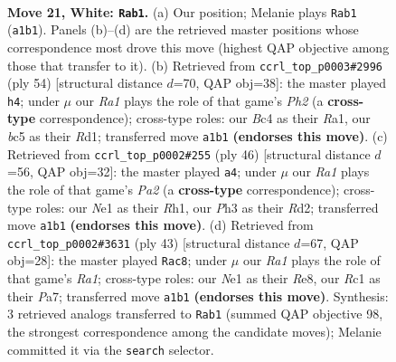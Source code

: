 \documentclass[11pt]{article}
\begin{document}
\clearpage

\begin{figure}[p]\centering
\begin{subfigure}{0.46\textwidth}\centering
\resizebox{\linewidth}{!}{%
\newchessgame
\chessboard[
  setfen={rnbr2k1/5p2/1p2pn2/2b4p/2B1P3/p1N3BP/PP3PK1/R1R1N3 w - - 0 21},
  showmover=false,
  pgfstyle=straightmove, color=movearrow, markmove={a1-b1}
]}
\caption{}
\end{subfigure}\hfill
\begin{subfigure}{0.46\textwidth}\centering
\resizebox{\linewidth}{!}{%
\newchessgame
\chessboard[
  setfen={r5k1/1r1n1p2/2bBp2p/p1p3p1/P3Pn2/2N2P2/6PP/R2R1BK1 w - - 4 28},
  showmover=false,
  pgfstyle=straightmove, color=movearrow, markmove={h2-h4}
]}
\caption{}
\end{subfigure}
\\[4pt]
\begin{subfigure}{0.46\textwidth}\centering
\resizebox{\linewidth}{!}{%
\newchessgame
\chessboard[
  setfen={2b1k2r/4b1p1/pr1pp1Pp/1p2n3/4P2P/2N3B1/PPPRB3/2K4R w k - 1 24},
  showmover=false,
  pgfstyle=straightmove, color=movearrow, markmove={a2-a4}
]}
\caption{}
\end{subfigure}\hfill
\begin{subfigure}{0.46\textwidth}\centering
\resizebox{\linewidth}{!}{%
\newchessgame
\chessboard[
  setfen={r3r1k1/pp3pbp/2ppb3/4n3/NPP2R2/2B3P1/P1R1PPBP/5K2 b - - 2 22},
  showmover=false,
  pgfstyle=straightmove, color=movearrow, markmove={a8-c8}
]}
\caption{}
\end{subfigure}
\caption{\textbf{Move 21, White: \texttt{Rab1}.} (a) Our position; Melanie plays \texttt{Rab1} (\texttt{a1b1}). Panels (b)--(d) are the retrieved master positions whose correspondence most drove this move (highest QAP objective among those that transfer to it). (b) Retrieved from \texttt{ccrl\_top\_p0003\#2996} (ply 54) [structural distance $d$=70, QAP obj=38]: the master played \texttt{h4}; under $\mu$ our \emph{Ra1} plays the role of that game's \emph{Ph2} (a \textbf{cross-type} correspondence); cross-type roles: our \emph{B}c4 as their \emph{R}a1, our \emph{b}c5 as their \emph{R}d1; transferred move \texttt{a1b1} \textbf{(endorses this move)}. (c) Retrieved from \texttt{ccrl\_top\_p0002\#255} (ply 46) [structural distance $d$=56, QAP obj=32]: the master played \texttt{a4}; under $\mu$ our \emph{Ra1} plays the role of that game's \emph{Pa2} (a \textbf{cross-type} correspondence); cross-type roles: our \emph{N}e1 as their \emph{R}h1, our \emph{P}h3 as their \emph{R}d2; transferred move \texttt{a1b1} \textbf{(endorses this move)}. (d) Retrieved from \texttt{ccrl\_top\_p0002\#3631} (ply 43) [structural distance $d$=67, QAP obj=28]: the master played \texttt{Rac8}; under $\mu$ our \emph{Ra1} plays the role of that game's \emph{Ra1}; cross-type roles: our \emph{N}e1 as their \emph{R}e8, our \emph{R}c1 as their \emph{P}a7; transferred move \texttt{a1b1} \textbf{(endorses this move)}. Synthesis: 3 retrieved analogs transferred to \texttt{Rab1} (summed QAP objective 98, the strongest correspondence among the candidate moves); Melanie committed it via the \texttt{search} selector.}
\label{fig:thought-m40}
\end{figure}
\end{document}
